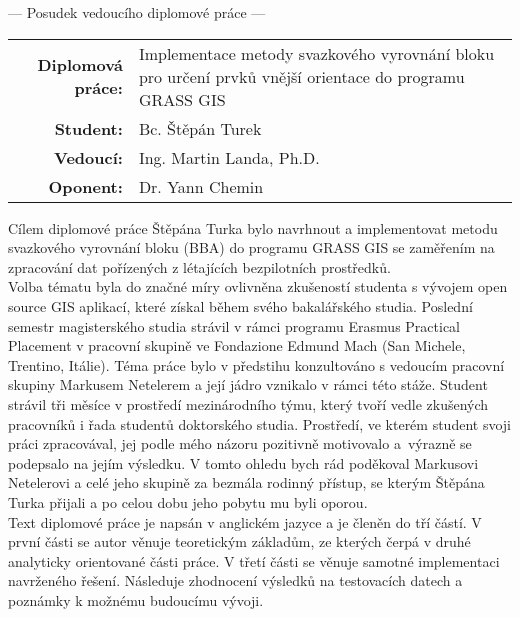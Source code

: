 \documentclass[czech,11pt,a4paper]{article}
\begin{document}
\begin{center}
  {\Large --- Posudek vedoucího diplomové práce ---}
\end{center}

\vspace{.5cm}

\noindent \begin{tabular}{rp{}}
  {\bf Diplomová práce:} & Implementace metody svazkového vyrovnání bloku pro určení prvků vnější orientace do programu GRASS GIS \\
  {\bf Student:} & Bc. Štěpán Turek \\
  {\bf Vedoucí:} & Ing. Martin Landa, Ph.D. \\
  {\bf Oponent:} & Dr. Yann Chemin \\
\end{tabular}

\vspace{1cm}

Cílem diplomové práce Štěpána Turka bylo navrhnout a implementovat
metodu svazkového vyrovnání bloku (BBA) do programu GRASS GIS se
zaměřením na zpracování dat pořízených z létajících bezpilotních
prostředků.
\\

Volba tématu byla do značné míry ovlivněna zkušeností studenta s
vývojem open source GIS aplikací, které získal během svého
bakalářského studia. Poslední semestr magisterského studia strávil v
rámci programu Erasmus Practical Placement v pracovní skupině  ve Fondazione Edmund Mach (San Michele,
Trentino, Itálie). Téma práce bylo v předstihu konzultováno s vedoucím
pracovní skupiny Markusem Netelerem a její jádro vznikalo v rámci
této stáže. Student strávil tři měsíce v prostředí mezinárodního týmu,
který tvoří vedle zkušených pracovníků i řada studentů doktorského
studia. Prostředí, ve kterém student svoji práci zpracovával, jej
podle mého názoru pozitivně motivovalo a~výrazně se podepsalo na jejím
výsledku. V tomto ohledu bych rád poděkoval Markusovi Netelerovi a
celé jeho skupině za bezmála rodinný přístup, se kterým Štěpána Turka
přijali a po celou dobu jeho pobytu mu byli oporou.  \\

Text diplomové práce je napsán v anglickém jazyce a je členěn do tří
částí. V první části se autor věnuje teoretickým základům, ze kterých
čerpá v druhé analyticky orientované části práce. V třetí části se
věnuje samotné implementaci navrženého řešení. Následuje zhodnocení
výsledků na testovacích datech a poznámky k možnému budoucímu vývoji.
\\
\end{document}
